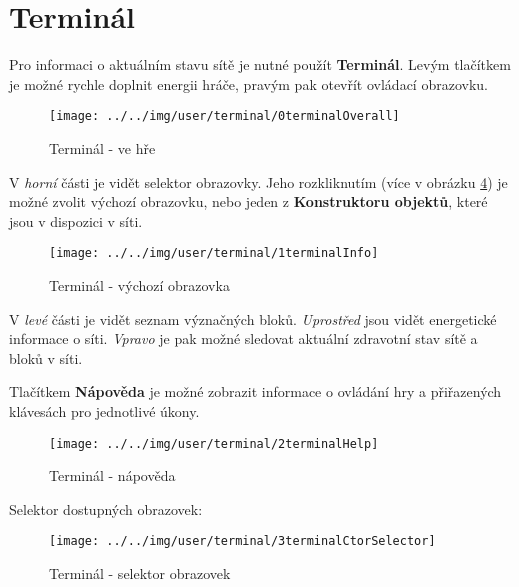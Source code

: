
\section{Terminál}

Pro informaci o aktuálním stavu sítě je nutné použít \textbf{Terminál}. Levým tlačítkem je možné rychle doplnit energii hráče, pravým pak otevřít ovládací obrazovku.

\begin{figure}[!ht]\centering
\texttt{[image: ../../img/user/terminal/0terminalOverall]}

\caption{Terminál - ve hře}
\label{fig:user_terminal_0terminalOverall}

\end{figure}

\FloatBarrier

V \textit{horní} části je vidět selektor obrazovky. Jeho rozkliknutím (více v obrázku \ref{fig:user_terminal_3terminalCtorSelector}) je možné zvolit výchozí obrazovku, nebo jeden z \textbf{Konstruktoru objektů}, které jsou v dispozici v síti.




\begin{figure}[!ht]\centering
\texttt{[image: ../../img/user/terminal/1terminalInfo]}

\caption{Terminál - výchozí obrazovka}
\label{fig:user_terminal_1terminalInfo}

\end{figure}

\FloatBarrier
V \textit{levé} části je vidět seznam význačných bloků. \textit{Uprostřed} jsou vidět energetické informace o síti. \textit{Vpravo} je pak možné sledovat aktuální zdravotní stav sítě a bloků v síti.

Tlačítkem \textbf{Nápověda} je možné zobrazit informace o ovládání hry a přiřazených klávesách pro jednotlivé úkony.

\begin{figure}[!ht]\centering
\texttt{[image: ../../img/user/terminal/2terminalHelp]}

\caption{Terminál - nápověda}
\label{fig:user_terminal_2terminalHelp}

\end{figure}

\FloatBarrier

Selektor dostupných obrazovek:

\begin{figure}[!ht]\centering
\texttt{[image: ../../img/user/terminal/3terminalCtorSelector]}

\caption{Terminál - selektor obrazovek}
\label{fig:user_terminal_3terminalCtorSelector}

\end{figure}

